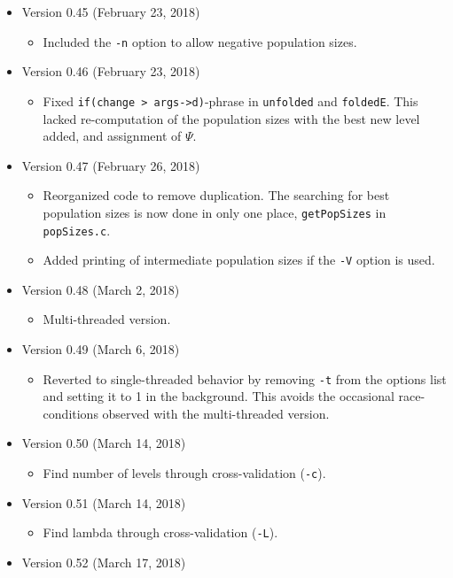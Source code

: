 \documentclass[a4paper, english]{article}
\newcommand{\ty}{\texttt}
\begin{document}
\begin{itemize}
\item Version 0.45 (February 23, 2018)
  \begin{itemize}
  \item Included the \ty{-n} option to allow negative population
    sizes.
  \end{itemize}
\item Version 0.46 (February 23, 2018)
  \begin{itemize}
    \item Fixed \ty{if(change > args->d)}-phrase in \ty{unfolded} and
      \ty{foldedE}. This lacked re-computation of the population sizes
      with the best new level added, and assignment of $\Psi$.
  \end{itemize}
\item Version 0.47 (February 26, 2018)
  \begin{itemize}
    \item Reorganized code to remove duplication. The searching for
      best population sizes is now done in only one place,
      \ty{getPopSizes} in \ty{popSizes.c}.
    \item Added printing of intermediate population sizes if the
      \ty{-V} option is used.
  \end{itemize}
\item Version 0.48 (March 2, 2018)
  \begin{itemize}
  \item Multi-threaded version.
  \end{itemize}
\item Version 0.49 (March 6, 2018)
  \begin{itemize}
  \item Reverted to single-threaded behavior by removing \ty{-t} from
    the options list and setting it to 1 in the background. This avoids the occasional
    race-conditions observed with the multi-threaded version.
  \end{itemize}
\item Version 0.50 (March 14, 2018)
  \begin{itemize}
  \item Find number of levels through cross-validation (\ty{-c}).
  \end{itemize}
\item Version 0.51 (March 14, 2018)
  \begin{itemize}
  \item Find lambda through cross-validation (\ty{-L}).
  \end{itemize}
\item Version 0.52 (March 17, 2018)

\end{itemize}
\end{document}
